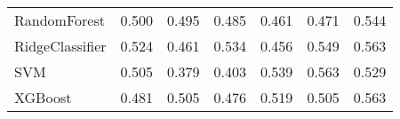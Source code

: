\begin{tabular}{lllllll}
                   RandomForest & 0.500 &                     0.495 &                 0.485 &                  0.461 &                                   0.471 &     0.544 \\
                RidgeClassifier & 0.524 &                     0.461 &                 0.534 &                  0.456 &                                   0.549 &     0.563 \\
                            SVM & 0.505 &                     0.379 &                 0.403 &                  0.539 &                                   0.563 &     0.529 \\
                        XGBoost & 0.481 &                     0.505 &                 0.476 &                  0.519 &                                   0.505 &     0.563 \\
\bottomrule
\end{tabular}
